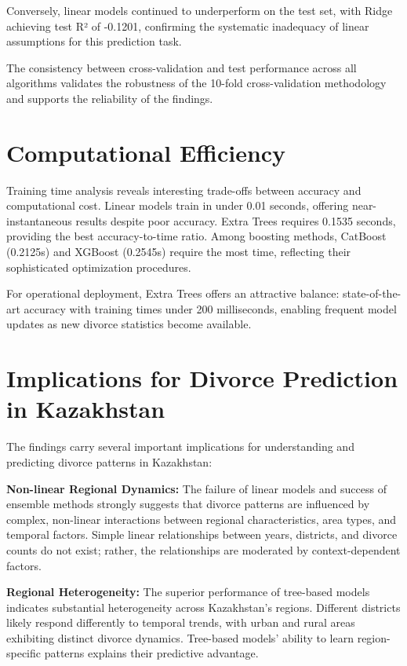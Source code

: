 Conversely, linear models continued to underperform on the test set, with Ridge achieving test R² of -0.1201, confirming the systematic inadequacy of linear assumptions for this prediction task.

The consistency between cross-validation and test performance across all algorithms validates the robustness of the 10-fold cross-validation methodology and supports the reliability of the findings.

\section{Computational Efficiency}

Training time analysis reveals interesting trade-offs between accuracy and computational cost. Linear models train in under 0.01 seconds, offering near-instantaneous results despite poor accuracy. Extra Trees requires 0.1535 seconds, providing the best accuracy-to-time ratio. Among boosting methods, CatBoost (0.2125s) and XGBoost (0.2545s) require the most time, reflecting their sophisticated optimization procedures.

For operational deployment, Extra Trees offers an attractive balance: state-of-the-art accuracy with training times under 200 milliseconds, enabling frequent model updates as new divorce statistics become available.

\section{Implications for Divorce Prediction in Kazakhstan}

The findings carry several important implications for understanding and predicting divorce patterns in Kazakhstan:

\textbf{Non-linear Regional Dynamics:} The failure of linear models and success of ensemble methods strongly suggests that divorce patterns are influenced by complex, non-linear interactions between regional characteristics, area types, and temporal factors. Simple linear relationships between years, districts, and divorce counts do not exist; rather, the relationships are moderated by context-dependent factors.

\textbf{Regional Heterogeneity:} The superior performance of tree-based models indicates substantial heterogeneity across Kazakhstan's regions. Different districts likely respond differently to temporal trends, with urban and rural areas exhibiting distinct divorce dynamics. Tree-based models' ability to learn region-specific patterns explains their predictive advantage.

